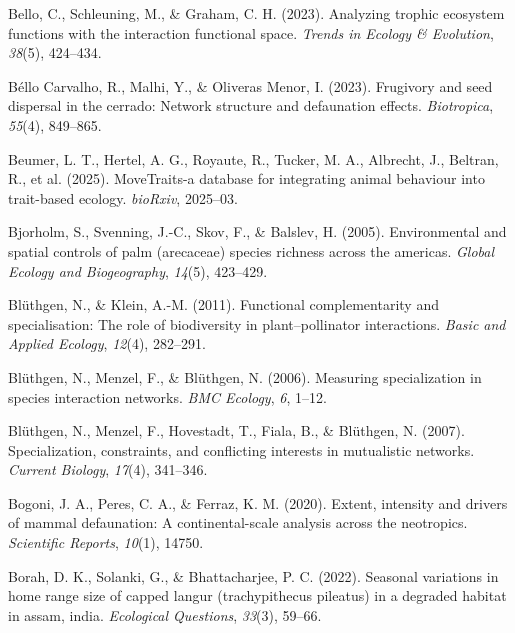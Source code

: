 \documentclass[
]{agujournal2019}
\newlength{\cslhangindent}
\newenvironment{CSLReferences}[2] %
 {\begin{list}{}{%
  \setlength{\itemindent}{0pt}
  \setlength{\leftmargin}{0pt}
  \setlength{\parsep}{0pt}
  \ifodd #1
   \setlength{\leftmargin}{\cslhangindent}
   \setlength{\itemindent}{-1\cslhangindent}
  \fi
  \setlength{\itemsep}{#2\baselineskip}}}
 {\end{list}}
\begin{document}
\begin{CSLReferences}{1}{0}
Bello, C., Schleuning, M., \& Graham, C. H. (2023). Analyzing trophic
ecosystem functions with the interaction functional space. \emph{Trends
in Ecology \& Evolution}, \emph{38}(5), 424--434.

Béllo Carvalho, R., Malhi, Y., \& Oliveras Menor, I. (2023). Frugivory
and seed dispersal in the cerrado: Network structure and defaunation
effects. \emph{Biotropica}, \emph{55}(4), 849--865.

Beumer, L. T., Hertel, A. G., Royaute, R., Tucker, M. A., Albrecht, J.,
Beltran, R., et al. (2025). MoveTraits-a database for integrating animal
behaviour into trait-based ecology. \emph{bioRxiv}, 2025--03.

Bjorholm, S., Svenning, J.-C., Skov, F., \& Balslev, H. (2005).
Environmental and spatial controls of palm (arecaceae) species richness
across the americas. \emph{Global Ecology and Biogeography},
\emph{14}(5), 423--429.

Blüthgen, N., \& Klein, A.-M. (2011). Functional complementarity and
specialisation: The role of biodiversity in plant--pollinator
interactions. \emph{Basic and Applied Ecology}, \emph{12}(4), 282--291.

Blüthgen, N., Menzel, F., \& Blüthgen, N. (2006). Measuring
specialization in species interaction networks. \emph{BMC Ecology},
\emph{6}, 1--12.

Blüthgen, N., Menzel, F., Hovestadt, T., Fiala, B., \& Blüthgen, N.
(2007). Specialization, constraints, and conflicting interests in
mutualistic networks. \emph{Current Biology}, \emph{17}(4), 341--346.

Bogoni, J. A., Peres, C. A., \& Ferraz, K. M. (2020). Extent, intensity
and drivers of mammal defaunation: A continental-scale analysis across
the neotropics. \emph{Scientific Reports}, \emph{10}(1), 14750.

Borah, D. K., Solanki, G., \& Bhattacharjee, P. C. (2022). Seasonal
variations in home range size of capped langur (trachypithecus pileatus)
in a degraded habitat in assam, india. \emph{Ecological Questions},
\emph{33}(3), 59--66.


\end{CSLReferences}
\end{document}
